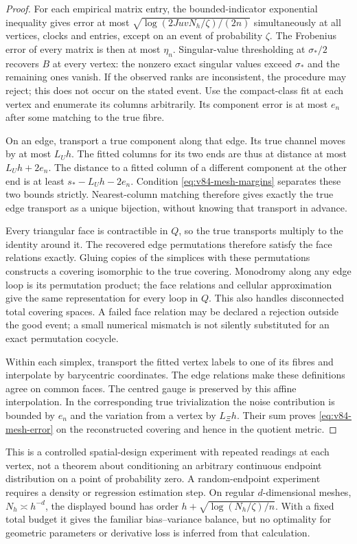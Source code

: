 \begin{proof}
For each empirical matrix entry, the bounded-indicator exponential
inequality \cite{V84Hoeffding} gives error at most
$\sqrt{\log(2JuvN_h/\zeta)/(2n)}$ simultaneously at all vertices,
clocks and entries, except on an event of probability $\zeta$.
The Frobenius error of every matrix is then at most $\eta_n$.
Singular-value thresholding at $\sigma_*/2$ recovers $B$ at every
vertex: the nonzero exact singular values exceed $\sigma_*$ and the
remaining ones vanish. If the observed ranks are inconsistent, the
procedure may reject; this does not occur on the stated event.
Use the compact-class fit at each vertex and enumerate its columns
arbitrarily. Its component error is at most $e_n$ after some matching
to the true fibre.

On an edge, transport a true component along that edge. Its true
channel moves by at most $L_Uh$. The fitted columns for its two ends
are thus at distance at most $L_Uh+2e_n$. The distance to a fitted
column of a different component at the other end is at least
$s_*-L_Uh-2e_n$. Condition \eqref{eq:v84-mesh-margins} separates these
two bounds strictly. Nearest-column matching therefore gives exactly
the true edge transport as a unique bijection, without knowing that
transport in advance.

Every triangular face is contractible in $Q$, so the true transports
multiply to the identity around it. The recovered edge permutations
therefore satisfy the face relations exactly. Gluing copies of the
simplices with these permutations constructs a covering isomorphic to
the true covering. Monodromy along any edge loop is its permutation
product; the face relations and cellular approximation give the same
representation for every loop in $Q$. This also handles disconnected
total covering spaces. A failed face relation may be declared a
rejection outside the good event; a small numerical mismatch is not
silently substituted for an exact permutation cocycle.

Within each simplex, transport the fitted vertex labels to one of its
fibres and interpolate by barycentric coordinates. The edge relations
make these definitions agree on common faces. The centred gauge is
preserved by this affine interpolation. In the corresponding true
trivialization the noise contribution is bounded by $e_n$ and the
variation from a vertex by $L_\Xi h$. Their sum proves
\eqref{eq:v84-mesh-error} on the reconstructed covering and hence in
the quotient metric.
\end{proof}
This is a controlled spatial-design experiment with repeated readings
at each vertex, not a theorem about conditioning an arbitrary continuous
endpoint distribution on a point of probability zero. A random-endpoint
experiment requires a density or regression estimation step. On regular
$d$-dimensional meshes, $N_h\asymp h^{-d}$, the displayed bound has
order $h+\sqrt{\log(N_h/\zeta)/n}$. With a fixed total budget it gives
the familiar bias--variance balance, but no optimality for geometric
parameters or derivative loss is inferred from that calculation.
